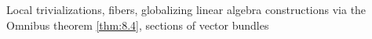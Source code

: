 Local trivializations, fibers, globalizing linear algebra constructions via the Omnibus theorem \ref{thm:8.4}, sections of vector bundles